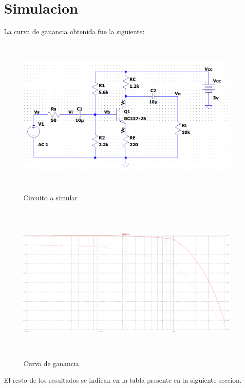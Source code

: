 \documentclass[a4paper,12pt]{article}
\begin{document}
\section{Simulacion}
    La curva de ganancia obtenida fue la siguiente:
    \begin{figure}[H]
		\centering
		\captionsetup{labelformat=empty}
		\includegraphics[height=80mm]{./imagenes/Circuito.png}
		\caption{\small{Circuito a simular}}
    \end{figure}
    \begin{figure}[H]
		\centering
		\captionsetup{labelformat=empty}
		\includegraphics[height=80mm]{./imagenes/Curva_Ganancia.png}
		\caption{\small{Curva de ganancia}}
    \end{figure}

    El resto de los resultados se indican en la tabla presente en la siguiente seccion.
\end{document}
